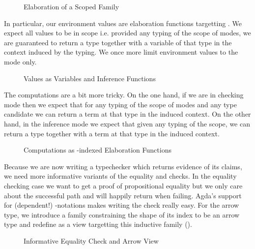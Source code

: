 \begin{figure}[h]
\caption{Elaboration of a Scoped Family}
\end{figure}

In particular, our environment values are elaboration functions targetting . We
expect all values to be in scope i.e. provided any typing of the scope of modes, we are
guaranteed to return a type together with a variable of that type in the context induced
by the typing. We once more limit environment values to the  mode only.

\begin{figure}[h]
\caption{Values as Variables and Inference Functions\label{fig:elabvalues}}
\end{figure}

The computations are a bit more tricky. On the one hand, if we are in checking mode
then we expect that for any typing of the scope of modes and any type candidate we
can  return a term at that type in the induced context. On the other hand,
in the inference mode we expect that given any typing of the scope, we can 
return a type together with a term at that type in the induced context.

\begin{figure}[h]
\caption{Computations as -indexed Elaboration Functions\label{fig:elabcomputations}}
\end{figure}

Because we are now writing a typechecker which returns evidence of its claims, we need
more informative variants of the equality and  checks. In the equality
checking case we want to get a proof of propositional equality but we only care
about the successful path and will happily return  when failing.
Agda's support for (dependent!) -notations makes writing the check
really easy. For the arrow type, we introduce a family  constraining the
shape of its index to be an arrow type and redefine  as a view targetting
this inductive family (\cite{Wadler:1987:VWP:41625.41653}).

\begin{figure}[h]
\begin{minipage}{0.5\textwidth}
\end{minipage}
\begin{minipage}{0.5\textwidth}
\end{minipage}
\caption{Informative Equality Check and Arrow View\label{fig:informativecheck}}
\end{figure}

